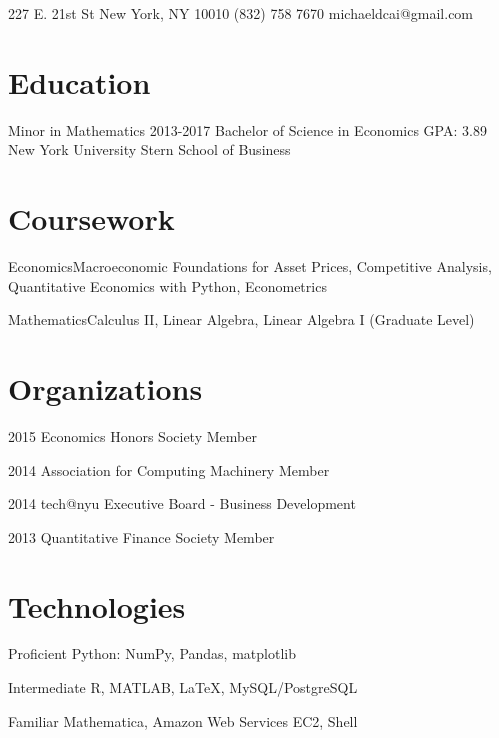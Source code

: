 \documentclass{tccv}
\begin{document}
\personal
    {227 E. 21st St \newline New York, NY 10010}
    {(832) 758 7670}
    {michaeldcai@gmail.com}

\section{Education}

\begin{yearlist}

\item[Minor in Mathematics]{2013-2017}
     {Bachelor of Science \newline in Economics \newline GPA: 3.89}
     {New York University \newline Stern School of Business}

\end{yearlist}

\section{Coursework}

\begin{factlist}
\item{Economics}{Macroeconomic Foundations for Asset Prices, Competitive Analysis,
Quantitative Economics with Python, Econometrics}
\item{Mathematics}{Calculus II, Linear Algebra, Linear Algebra I (Graduate Level)}
\end{factlist}

\section{Organizations}

\begin{yearlist}

\item{2015}
     {Economics Honors Society}
     {Member}

\item{2014}
     {Association for Computing \newline Machinery}
     {Member}

\item{2014}
     {tech@nyu}
     {Executive Board - Business Development}

\item{2013}
     {Quantitative Finance Society}
     {Member}

\end{yearlist}


\section{Technologies}

\begin{factlist}

\item{Proficient}
     {Python: NumPy, Pandas, matplotlib}

\item{Intermediate}
     {R, MATLAB, \LaTeX, MySQL/PostgreSQL}

\item{Familiar}
     {Mathematica, Amazon Web Services EC2, Shell}

\end{factlist}
\end{document}

